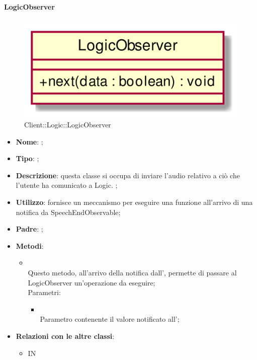 \hypertarget{LogicObserver_label}{\paragraph{LogicObserver}}
\begin{figure}[h]
	\centering
	\includegraphics[width=\textwidth,height=\textheight,keepaspectratio]{images/ClassLogicObserver.png}
	\caption{Client::Logic::LogicObserver}
\end{figure}
\begin{itemize}
	\item \textbf{Nome}: ;
	\item \textbf{Tipo}: ;
	\item \textbf{Descrizione}: questa classe si occupa di inviare l'audio relativo a ciò che  l'utente ha comunicato a Logic.
;
	\item \textbf{Utilizzo}: fornisce un meccanismo per eseguire una funzione all'arrivo di una notifica da SpeechEndObservable;
	\item \textbf{Padre}: ;
	\item \textbf{Metodi}:
	\begin{itemize}
		\item[]  \\
		Questo metodo, all'arrivo della notifica dall', permette di passare al LogicObserver un'operazione da eseguire;\\
		Parametri:
		\begin{itemize}
			\item {} \\
			Parametro contenente il valore notificato all';
		\end{itemize}
	\end{itemize}
	\item \textbf{Relazioni con le altre classi}:
	\begin{itemize}
		\item IN \hyperlink{SpeechEndObservable_label}{}
	\end{itemize}
\end{itemize}
\FloatBarrier

